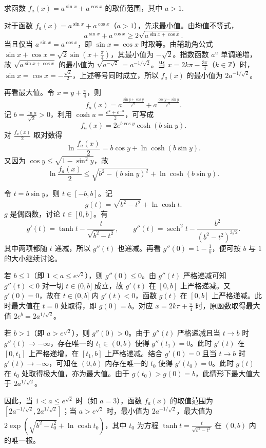 \newpage
\begin{example}[三角函数]
    求函数 $f_a(x) = a^{\sin x} + a^{\cos x}$ 的取值范围，其中 $a > 1$.
\end{example}
\begin{solution}
对于函数 $f_a(x) = a^{\sin x} + a^{\cos x}$（$a > 1$），先求最小值。由均值不等式，
\[
a^{\sin x} + a^{\cos x} \geq 2\sqrt{a^{\sin x + \cos x}}.
\]
当且仅当 $a^{\sin x} = a^{\cos x}$，即 $\sin x = \cos x$ 时取等。由辅助角公式 $\sin x + \cos x = \sqrt{2}\sin\left(x + \frac{\pi}{4}\right)$，其最小值为 $-\sqrt{2}$。指数函数 $a^u$ 单调递增，故 $\sqrt{a^{\sin x + \cos x}}$ 的最小值为 $\sqrt{a^{-\sqrt{2}}} = a^{-1/\sqrt{2}}$。当 $x = 2k\pi - \frac{3\pi}{4}$（$k \in \mathbb{Z}$）时，$\sin x = \cos x = -\frac{\sqrt{2}}{2}$，上述等号同时成立，所以 $f_a(x)$ 的最小值为 $2a^{-1/\sqrt{2}}$。

再看最大值。令 $x = y + \frac{\pi}{4}$，则
\[
f_a(x) = a^{\frac{\sin y + \cos y}{\sqrt{2}}} + a^{\frac{\cos y - \sin y}{\sqrt{2}}}.
\]
记 $b = \frac{\ln a}{\sqrt{2}} > 0$，利用 $\cosh u = \frac{e^u + e^{-u}}{2}$，可写成
\[
f_a(x) = 2e^{b \cos y} \cosh(b \sin y).
\]
对 $\frac{f_a(x)}{2}$ 取对数得
\[
\ln\frac{f_a(x)}{2} = b \cos y + \ln \cosh(b \sin y).
\]
又因为 $\cos y \leq \sqrt{1 - \sin^2 y}$，故
\[
\ln\frac{f_a(x)}{2} \leq \sqrt{b^2 - (b\sin y)^2} + \ln \cosh(b \sin y).
\]

令 $t = b \sin y$，则 $t \in [-b, b]$。记
\[
g(t) = \sqrt{b^2 - t^2} + \ln \cosh t.
\]
$g$ 是偶函数，讨论 $t \in [0,b]$。有
\[
g'(t) = \tanh t - \frac{t}{\sqrt{b^2 - t^2}},\qquad
g''(t) = \operatorname{sech}^2 t - \frac{b^2}{(b^2 - t^2)^{3/2}}.
\]
其中两项都随 $t$ 递减，所以 $g''(t)$ 也递减。再看 $g''(0) = 1 - \frac{1}{b}$，便可按 \(b\) 与 \(1\) 的大小继续讨论。

若 $b \leq 1$（即 $1 < a \leq e^{\sqrt{2}}$），则 $g''(0) \leq 0$。由 $g''(t)$ 严格递减可知 $g''(t) < 0$ 对一切 $t \in (0, b]$ 成立，故 $g'(t)$ 在 $[0, b]$ 上严格递减。又 $g'(0) = 0$，故在 $t \in (0, b]$ 内 $g'(t) < 0$，函数 $g(t)$ 在 $[0, b]$ 上严格递减。此时最大值在 $t = 0$ 处取得，即 $g(0) = b$。对应 $x = 2k\pi + \frac{\pi}{4}$ 时，原函数取得最大值 $2e^b = 2a^{1/\sqrt{2}}$。

若 $b > 1$（即 $a > e^{\sqrt{2}}$），则 $g''(0) > 0$。由于 $g''(t)$ 严格递减且当 $t \to b$ 时 $g''(t) \to -\infty$，存在唯一的 $t_1 \in (0, b)$ 使得 $g''(t_1) = 0$。此时 $g'(t)$ 在 $[0, t_1]$ 上严格递增，在 $[t_1, b]$ 上严格递减。结合 $g'(0) = 0$ 且当 $t \to b$ 时 $g'(t) \to -\infty$，可知在 $(0, b)$ 内存在唯一的 $t_0$ 使得 $g'(t_0) = 0$。此时 $g(t)$ 在 $t_0$ 处取得极大值，亦为最大值。由于 $g(t_0) > g(0) = b$，此情形下最大值大于 $2a^{1/\sqrt{2}}$。

因此，当 $1 < a \leq e^{\sqrt{2}}$ 时（如 $a=3$），函数 $f_a(x)$ 的取值范围为 $[2a^{-1/\sqrt{2}}, 2a^{1/\sqrt{2}}]$；当 $a > e^{\sqrt{2}}$ 时，最小值为 $2a^{-1/\sqrt{2}}$，最大值为 $2\exp\left(\sqrt{b^2 - t_0^2} + \ln \cosh t_0\right)$，其中 $t_0$ 为方程 $\tanh t = \frac{t}{\sqrt{b^2 - t^2}}$ 在 $(0, b)$ 内的唯一根。
\end{solution}

